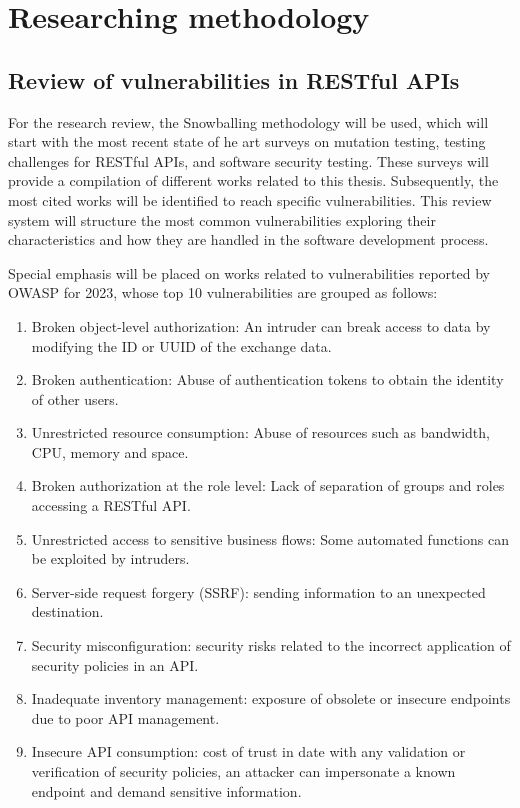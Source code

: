 \section{Researching methodology} \label{sec:researching_methodology}

\subsection{ Review of vulnerabilities in RESTful APIs} 

For the research review, the Snowballing methodology\cite{Chaim2008}  will be used, which will start with the most recent state of he art surveys on mutation testing\cite{Papadakis2019}, testing challenges for RESTful APIs\cite{Ehsan2022}, and software security testing\cite{Golmohammadi2023}. These surveys will provide a compilation of different works related to this thesis. Subsequently, the most cited works will be identified to reach specific vulnerabilities. This review system will structure the most common vulnerabilities exploring their characteristics and how they are handled in the software development process.

Special emphasis will be placed on works related to vulnerabilities reported by OWASP for 2023, whose top 10 vulnerabilities are grouped as follows:

\begin{enumerate}
    \item Broken object-level authorization: An intruder can break access to data by modifying the ID or UUID of the exchange data.
    \item Broken authentication: Abuse of authentication tokens to obtain the identity of other users.
    \item Unrestricted resource consumption: Abuse of resources such as bandwidth, CPU, memory and space.
    \item Broken authorization at the role level: Lack of separation of groups and roles accessing a RESTful API.
    \item Unrestricted access to sensitive business flows: Some automated functions can be exploited by intruders.
    \item Server-side request forgery (SSRF): sending information to an unexpected destination.
    \item Security misconfiguration: security risks related to the incorrect application of security policies in an API.
    \item Inadequate inventory management: exposure of obsolete or insecure endpoints due to poor API management.
    \item Insecure API consumption: cost of trust in date with any validation or verification of security policies, an attacker can impersonate a known endpoint and demand sensitive information.
\end{enumerate}

